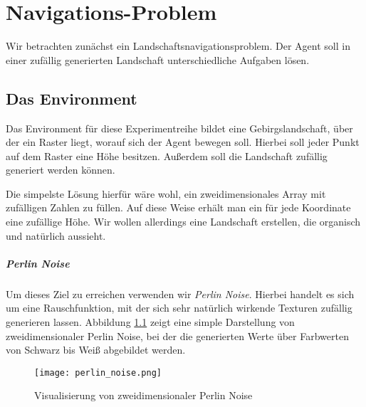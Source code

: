 \chapter{Navigations-Problem}\label{sec:NavigationProblem}
Wir betrachten zunächst ein Landschaftsnavigationsproblem. Der Agent soll in einer zufällig generierten Landschaft unterschiedliche Aufgaben lösen.

\section{Das Environment}

Das Environment für diese Experimentreihe bildet eine Gebirgslandschaft, über der ein Raster liegt, worauf sich der Agent bewegen soll. Hierbei soll jeder Punkt auf dem Raster eine Höhe besitzen. Außerdem soll die Landschaft zufällig generiert werden können.

Die simpelste Lösung hierfür wäre wohl, ein zweidimensionales Array mit zufälligen Zahlen zu füllen. Auf diese Weise erhält man ein für jede Koordinate eine zufällige Höhe. Wir wollen allerdings eine Landschaft erstellen, die organisch und natürlich aussieht.

\paragraph{Perlin Noise}
Um dieses Ziel zu erreichen verwenden wir \textit{Perlin Noise}. Hierbei handelt es sich um eine Rauschfunktion, mit der sich sehr natürlich wirkende Texturen zufällig generieren lassen. Abbildung \ref{img:perlinNoise} zeigt eine simple Darstellung von zweidimensionaler Perlin Noise, bei der die generierten Werte über Farbwerten von Schwarz bis Weiß abgebildet werden.

\begin{figure}[h]
    \centering
    \texttt{[image: perlin\_noise.png]}
    \caption{Visualisierung von zweidimensionaler Perlin Noise} \label{img:perlinNoise}
\end{figure}



